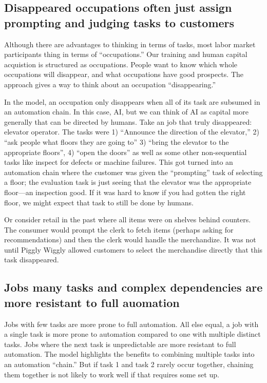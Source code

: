 \documentclass{article}
\theoremstyle{plain}
\theoremstyle{plain}
\begin{document}
\subsection{Disappeared occupations often just assign prompting and judging tasks to customers}
Although there are advantages to thinking in terms of tasks, most labor market participants thing in terms of ``occupations.'' 
Our training and human capital acquistion is structured as occupations.
People want to know which whole occupations will disappear, and what occupations have good prospects. 
The approach gives a way to think about an occupation ``disappearing.''

In the model, an occupation only disappears when all of its task are subsumed in an automation chain.
In this case, AI, but we can think of AI as capital more generally that can be directed by humans. 
Take an job that truly disappeared: elevator operator. 
The tasks were 1) ``Announce the direction of the elevator,'' 2) ``ask people what floors they are going to'' 3) ``bring the elevator to the appropriate floors'', 4) ``open the doors'' as well as some other non-sequential tasks like inspect for defects or machine failures.  
This got turned into an automation chain where the customer was given the ``prompting'' task of selecting a floor; the evaluation task is just seeing that the elevator was the appropriate floor---an inspection good.
If it was hard to know if you had gotten the right floor, we might expect that task to still be done by humans.

Or consider retail in the past where all items were on shelves behind counters. 
The consumer would prompt the clerk to fetch items (perhaps asking for recommendations) and then the clerk would handle the merchandize. 
It was not until Piggly Wiggly allowed customers to select the merchandise directly that this task disappeared. 

\subsection{Jobs many tasks and complex dependencies are more resistant to full auomation}
Jobs with few tasks are more prone to full automation.
All else equal, a job with a single task is more prone to automation compared to one with multiple distinct tasks.
Jobs where the next task is unpredictable are more resistant to full automation.
The model highlights the benefits to combining multiple tasks into an automation ``chain.''
But if task 1 and task 2 rarely occur together, chaining them together is not likely to work well if that requires some set up.
\end{document}
